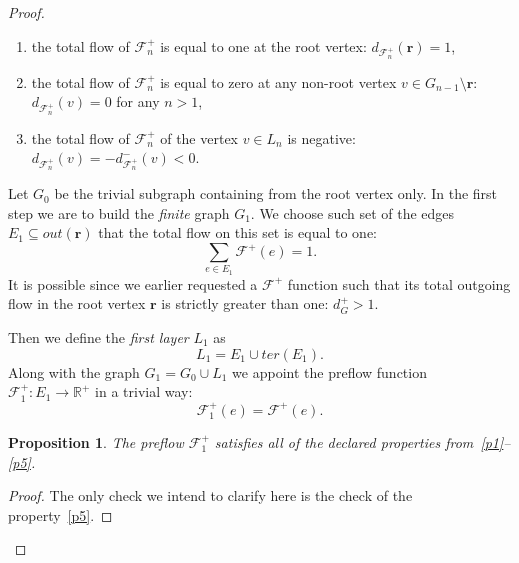 \documentclass[12pt]{article}
\newtheorem{prop}{Proposition}
\theoremstyle{definition}
\newcommand{\flowpos}{\mathcal{F}^{+}}
\newcommand{\flowposn}[1]{\mathcal{F}_{#1}^{+}}
\newcommand{\ter}{ter}
\newcommand{\eout}{out}
\renewcommand{\root}{\mathbf{r}}
\numberwithin{remark}{section}
\numberwithin{theorem}{section}
\numberwithin{prop}{section}
\numberwithin{equation}{section}
\numberwithin{lemma}{section}
\numberwithin{prop_under_lemma}{lemma}
\begin{document}
\begin{proof}
\begin{enumerate}[label=\textbf{P\arabic*}]
          \item \label{p3} the total flow of $\flowposn{n}$ is equal to one at the root vertex: $d_{\flowposn{n}}(\root) = 1$,
          \item \label{p4} the total flow of $\flowposn{n}$ is equal to zero at any non-root vertex $v \in G_{n-1}\setminus \root$: $d_{\flowposn{n}}(v) = 0$ for any $n > 1$,
          \item \label{p5} the total flow of $\flowposn{n}$ of the vertex $v \in L_n$ is negative: $d_{\flowposn{n}}(v) = -d^{-}_{\flowposn{n}}(v) < 0$.
        \end{enumerate}
      Let $G_0$ be the trivial subgraph containing from the root vertex only.
      In the first step we are to build the \emph{finite} graph $G_1$.
      We choose such set of the edges $E_1 \subseteq \eout(\root)$ that the total flow on this set is equal to one:
      \[
        \sum_{e \in E_1} \flowpos(e) = 1.
      \]
      It is possible since we earlier requested a $\flowpos$ function such that its total outgoing flow in the root vertex
        $\root$ is strictly greater than one: $d^{+}_{G} > 1$.

      Then we define the \emph{first layer} $L_1$ as
      \[
        L_1 = E_1 \cup \ter(E_1).
      \]
      Along with the graph $G_1 = G_0 \cup L_1$ we appoint the preflow function $\flowposn{1}: E_1 \to \mathbb{R}^{+}$ in a trivial way:
      \[
        \flowposn{1}(e) = \flowpos(e).
      \]
      \begin{prop}
        The preflow $\flowposn{1}$ satisfies all of the declared properties from~\ref{p1}--\ref{p5}.
      \end{prop}
      \begin{proof}
        The only check we intend to clarify here is the check of the property~\ref{p5}.


\end{proof}
\end{proof}
\end{document}
